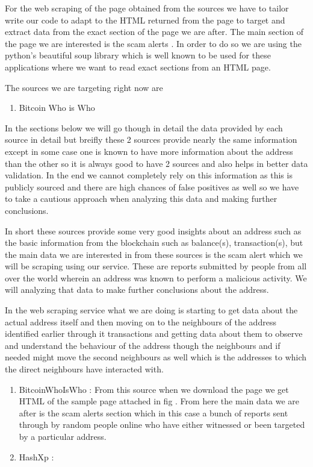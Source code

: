 \documentclass{article}
\begin{document}
        For the web scraping of the page obtained from the sources we have to tailor write our code to adapt to the HTML returned from the page to target and extract data from the exact section of the page we are after. The main section of the page we are interested is the scam alerts \cite{}. In order to do so we are using the python's\cite{python.org} beautiful soup\cite{beautiful_soup_documentation} library which is well known to be used for these applications where we want to read exact sections from an HTML page.
        
        
        The sources we are targeting right now are 
        \begin{enumerate}
            \item Bitcoin Who is Who \cite{bitcoinwhoswho}
        \end{enumerate}
        In the sections below we will go though in detail the data provided by each source in detail but breifly these 2 sources provide nearly the same information except in some case one is known to have more information about the address than the other so it is always good to have 2 sources and also helps in better data validation. In the end we cannot completely rely on this information as this is publicly sourced and there are high chances of false positives as well so we have to take a cautious approach when analyzing this data and making further conclusions. 
        
        In short these sources provide some very good insights about an address such as the basic information from the blockchain such as balance(s), transaction(s), but the main data we are interested in from these sources is the scam alert which we will be scraping using our service. These are reports submitted by people from all over the world wherein an address was known to perform a malicious activity. We will analyzing that data to make further conclusions about the address.
        
        In the web scraping service what we are doing is starting to get data about the actual address itself and then moving on to the neighbours of the address identified earlier through it transactions and getting data about them to observe and understand the behaviour of the address though the neighbours and if needed might move the second neighbours as well which is the addresses to which the direct neighbours have interacted with.
        \begin{enumerate}
            \item BitcoinWhoIsWho : From this source when we download the page we get HTML of the sample page attached in fig \cite{} . From here the main data we are after is the scam alerts section which in this case a bunch of reports sent through by random people online who have either witnessed or been targeted by a particular address. 
            \item HashXp : 
        \end{enumerate}
        
\end{document}
